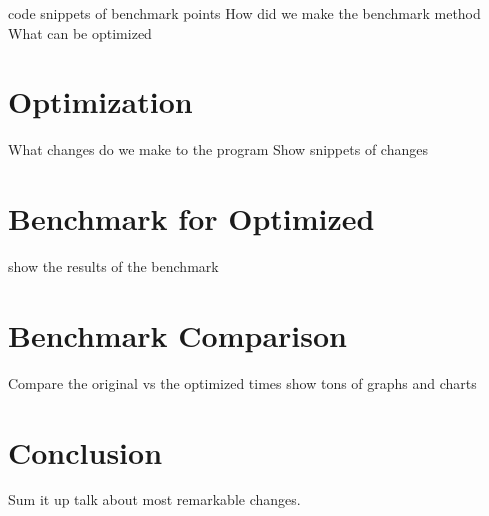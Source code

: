 \documentclass{article}
\begin{document}
code snippets of benchmark points
How did we make the benchmark method
What can be optimized

\section{Optimization}
What changes do we make to the program
Show snippets of changes

\section{Benchmark for Optimized}
show the results of the benchmark

\section{Benchmark Comparison}
Compare the original vs the optimized times
show tons of graphs and charts

\section{Conclusion}
Sum it up 
talk about most remarkable changes.
\end{document}
